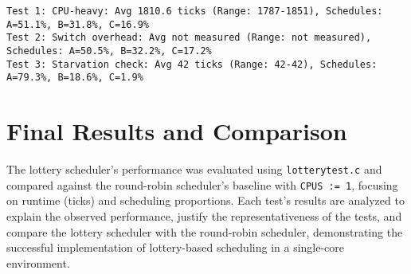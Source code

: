 \documentclass{article}
\begin{document}
\begin{lstlisting}[breaklines=true]
Test 1: CPU-heavy: Avg 1810.6 ticks (Range: 1787-1851), Schedules: A=51.1%, B=31.8%, C=16.9%
Test 2: Switch overhead: Avg not measured (Range: not measured), Schedules: A=50.5%, B=32.2%, C=17.2%
Test 3: Starvation check: Avg 42 ticks (Range: 42-42), Schedules: A=79.3%, B=18.6%, C=1.9%
\end{lstlisting}

\section{Final Results and Comparison}
The lottery scheduler’s performance was evaluated using \texttt{lotterytest.c} and compared against the round-robin scheduler’s baseline with \texttt{CPUS := 1}, focusing on runtime (ticks) and scheduling proportions. Each test’s results are analyzed to explain the observed performance, justify the representativeness of the tests, and compare the lottery scheduler with the round-robin scheduler, demonstrating the successful implementation of lottery-based scheduling in a single-core environment.
\end{document}
